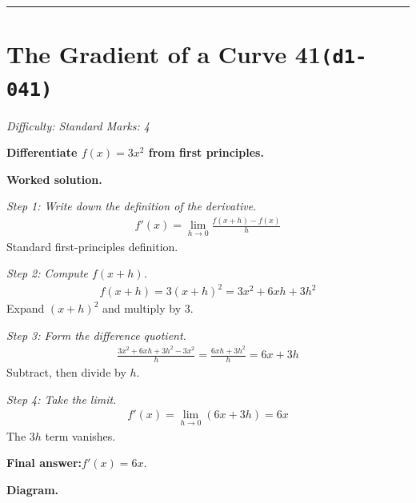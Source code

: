 \documentclass[11pt]{article}
\newcommand{\question}[1]{\par\medskip\noindent\textbf{#1}\par}
\begin{document}
\medskip\hrule

\section*{The Gradient of a Curve 41\quad\small\texttt{(d1-041)}}
\textit{Difficulty: Standard \quad\textbar\quad Marks: 4}

\question{Differentiate \( f(x) = 3x^2 \) from first principles.}

\textbf{Worked solution.}

\textit{Step 1: Write down the definition of the derivative.}
\[\begin{gathered}
f'(x) = \lim_{h \to 0}\frac{f(x+h) - f(x)}{h}
\end{gathered}\]
Standard first-principles definition.

\textit{Step 2: Compute \( f(x+h) \).}
\[\begin{gathered}
f(x+h) = 3(x+h)^2 = 3x^2 + 6xh + 3h^2
\end{gathered}\]
Expand \( (x+h)^2 \) and multiply by 3.

\textit{Step 3: Form the difference quotient.}
\[\begin{gathered}
\frac{3x^2 + 6xh + 3h^2 - 3x^2}{h} = \frac{6xh + 3h^2}{h} = 6x + 3h
\end{gathered}\]
Subtract, then divide by \( h \).

\textit{Step 4: Take the limit.}
\[\begin{gathered}
f'(x) = \lim_{h \to 0}(6x + 3h) = 6x
\end{gathered}\]
The \( 3h \) term vanishes.

\begin{answerbox}
\textbf{Final answer:}\quad \(\displaystyle  f'(x) = 6x \).
\end{answerbox}
\textbf{Diagram.}
\end{document}
